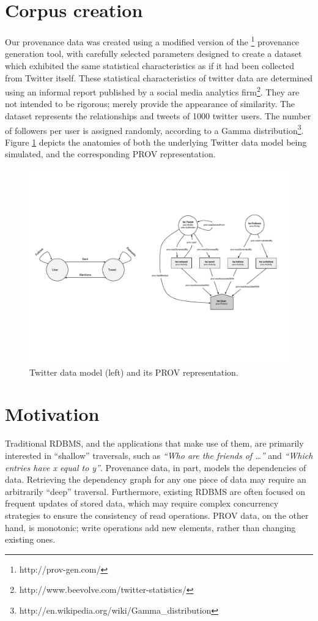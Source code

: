 \documentclass{llncs2e/llncs}
\begin{document}
\section{Corpus creation}
%
Our provenance data was created using a modified version of the \provGen{}\footnote{http://prov-gen.com/} provenance generation tool, with carefully selected parameters designed to create a dataset which exhibited the same statistical characteristics as if it had been collected from Twitter itself.
%
These statistical characteristics of twitter data are determined using an informal report published by a social media analytics firm\footnote{http://www.beevolve.com/twitter-statistics/}.
%
They are not intended to be rigorous; merely provide the appearance of similarity.
%
The dataset represents the relationships and tweets of 1000 twitter users.
%
The number of followers per user is assigned randomly, according to a Gamma distribution\footnote{http://en.wikipedia.org/wiki/Gamma\_distribution}.
%
Figure \ref{figure:data-model} depicts the anatomies of both the underlying Twitter data model being simulated, and the corresponding PROV representation.
%
\begin{figure}
    \includegraphics[width=1.1\textwidth]{figures/data_model}
    \caption{Twitter data model (left) and its PROV representation.}
    \label{figure:data-model}
\end{figure}

%
\section{Motivation}
%
Traditional RDBMS, and the applications that make use of them, are primarily interested in ``shallow'' traversals, such as \textit{``Who are the friends of \ldots''} and \textit{``Which entries have x equal to y''}.
%
Provenance data, in part, models the dependencies of data.
%
Retrieving the dependency graph for any one piece of data may require an arbitrarily ``deep'' traversal.
%
Furthermore, existing RDBMS are often focused on frequent updates of stored data, which may require complex concurrency strategies to ensure the consistency of read operations. 
%
PROV data, on the other hand, is monotonic; write operations add new elements, rather than changing existing ones. 
%
\end{document}

